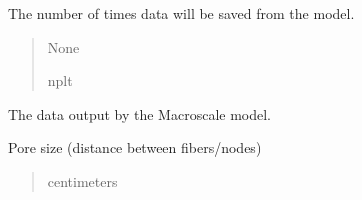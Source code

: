\documentclass[letterpaper,10pt,english]{sphinxmanual}
\begin{document}
\begin{fulllineitems}
\begin{fulllineitems}
\label{\detokenize{lysis.util:lysis.util.parameters.MacroParameters.number_of_saves}}
\pysigstartsignatures
{}
\pysigstopsignatures
\sphinxAtStartPar
The number of times data will be saved from the model.
\begin{quote}\begin{description}
\sphinxAtStartPar
None

\sphinxAtStartPar
nplt

\end{description}\end{quote}

\end{fulllineitems}


\begin{fulllineitems}
\label{\detokenize{lysis.util:lysis.util.parameters.MacroParameters.output_data}}
\pysigstartsignatures
{}
\pysigstopsignatures
\sphinxAtStartPar
The data output by the Macroscale model.

\end{fulllineitems}


\begin{fulllineitems}
\label{\detokenize{lysis.util:lysis.util.parameters.MacroParameters.pore_size}}
\pysigstartsignatures
{}
\pysigstopsignatures
\sphinxAtStartPar
Pore size (distance between fibers/nodes)
\begin{quote}\begin{description}
\sphinxAtStartPar
centimeters


\end{description}
\end{quote}
\end{fulllineitems}
\end{fulllineitems}
\end{document}
